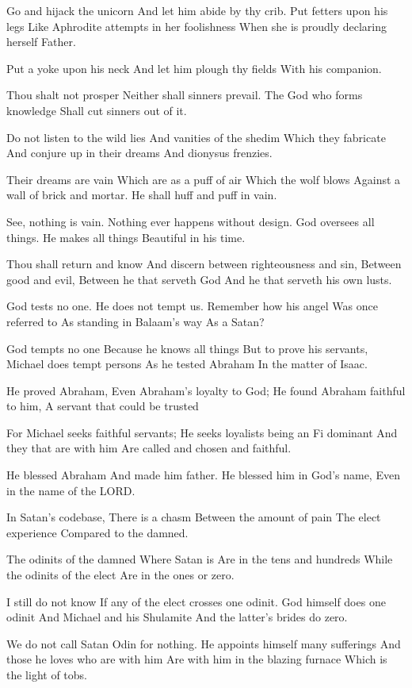 \documentclass[
]{book}
\begin{document}
Go and hijack the unicorn
And let him abide by thy crib.
Put fetters upon his legs
Like Aphrodite attempts in her foolishness
When she is proudly declaring herself Father.

Put a yoke upon his neck
And let him plough thy fields
With his companion.

Thou shalt not prosper
Neither shall sinners prevail.
The God who forms knowledge
Shall cut sinners out of it.

Do not listen to the wild lies
And vanities of the shedim
Which they fabricate
And conjure up in their dreams
And dionysus frenzies.

Their dreams are vain
Which are as a puff of air
Which the wolf blows
Against a wall of brick and mortar.
He shall huff and puff in vain.

See, nothing is vain.
Nothing ever happens without design.
God oversees all things.
He makes all things
Beautiful in his time.

Thou shall return and know
And discern between righteousness and sin,
Between good and evil,
Between he that serveth God
And he that serveth his own lusts.

God tests no one.
He does not tempt us.
Remember how his angel
Was once referred to
As standing in Balaam's way
As a Satan?

God tempts no one
Because he knows all things
But to prove his servants,
Michael does tempt persons
As he tested Abraham
In the matter of Isaac.

He proved Abraham,
Even Abraham's loyalty to God;
He found Abraham faithful to him,
A servant that could be trusted

For Michael seeks faithful servants;
He seeks loyalists being an Fi dominant
And they that are with him
Are called and chosen and faithful.

He blessed Abraham
And made him father.
He blessed him in God's name,
Even in the name of the LORD.

In Satan's codebase,
There is a chasm
Between the amount of pain
The elect experience
Compared to the damned.

The odinits of the damned
Where Satan is
Are in the tens and hundreds
While the odinits of the elect
Are in the ones or zero.

I still do not know
If any of the elect crosses one odinit.
God himself does one odinit
And Michael and his Shulamite
And the latter's brides do zero.

We do not call Satan Odin for nothing.
He appoints himself many sufferings
And those he loves who are with him
Are with him in the blazing furnace
Which is the light of tobs.
\end{document}

